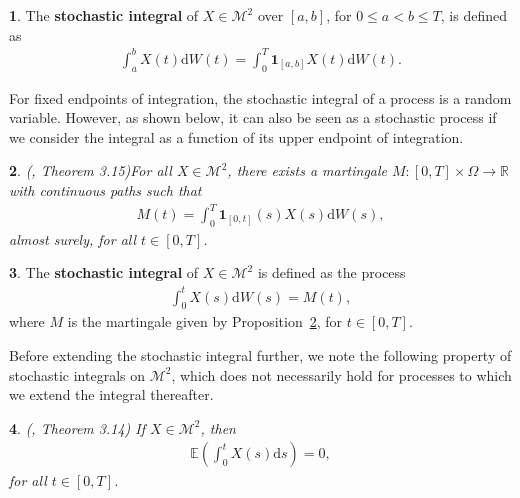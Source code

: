 \documentclass[english]{article}
\numberwithin{equation}{section}
\numberwithin{figure}{section}
\theoremstyle{bolddescit}
\newtheorem{theorem}{\protect\theoremname}[section]
\theoremstyle{definition}
\newtheorem{definition}[theorem]{\protect\definitionname}
\theoremstyle{definition}
\theoremstyle{plain}
\theoremstyle{plain}
\theoremstyle{bolddesc}
\theoremstyle{plain}
\newtheorem{proposition}[theorem]{\protect\propositionname}
\theoremstyle{remark}
\providecommand{\definitionname}{Definition}
\providecommand{\propositionname}{Proposition}
\providecommand{\theoremname}{Theorem}
\begin{document}
\begin{definition}
  The \textbf{stochastic integral} of $X \in \mathcal{M}^2$ over $[a,b]$, for $0 \le a < b \le T$, is defined as
  \begin{align*}
    \int_a^b X(t) \mathrm{d}W(t)
    = \int_0^T \mathbf{1}_{[a,b]} X(t) \mathrm{d}W(t).
  \end{align*}
\end{definition}

For fixed endpoints of integration, the stochastic integral of a process is a random variable. However, as shown below, it can also be seen as a stochastic process if we consider the integral as a function of its upper endpoint of integration.

\begin{proposition}(\cite{capinski_stochastic_2012}, Theorem 3.15)\label{prop:stochastic-integral-martingale}
  For all $X \in \mathcal{M}^2$, there exists a martingale $M : [0,T] \times \Omega \to \mathbb{R}$ with continuous paths such that
  \begin{align*}
    M(t) = \int_0^T \mathbf{1}_{[0,t]}(s) X(s) \mathrm{d}W(s),
  \end{align*}
  almost surely, for all $t \in [0,T]$.
\end{proposition}

\begin{definition}\label{def:stochastic-integral-as-process}
  The \textbf{stochastic integral} of $X \in \mathcal{M}^2$ is defined as the process
  \begin{align}\label{eq:stochastic-integral-process}
    \int_0^t X(s) \mathrm{d}W(s) = M(t),
  \end{align}
  where $M$ is the martingale given by Proposition~\ref{prop:stochastic-integral-martingale}, for $t \in [0,T]$.
\end{definition}

Before extending the stochastic integral further, we note the following property of stochastic integrals on $\mathcal{M}^2$, which does not necessarily hold for processes to which we extend the integral thereafter.

\begin{theorem}\label{thm:stochastic-integral-expectation-m2}
  (\cite{capinski_stochastic_2012}, Theorem 3.14)
  If $X \in \mathcal{M}^2$, then
  \begin{align*}
    \mathbb{E}\left(\int_0^t X(s) \mathrm{d}s\right) = 0,
  \end{align*}
  for all $t \in [0,T]$.
\end{theorem}
\end{document}
